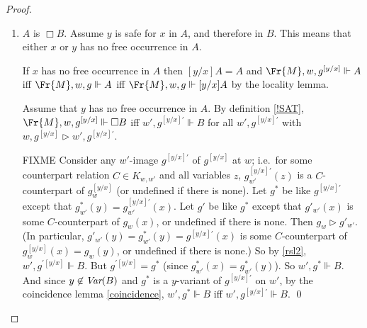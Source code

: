 \documentclass[11pt]{woarticle}
\theoremstyle{break}
\theoremstyle{nonumberplain}
\newcommand{\SAT}{\Vdash}
\newcommand{\Img}{\triangleright}
\newcommand{\1}{\;\,|\;\,}
\newcommand{\var}{\emph{Var}}
\newcommand{\fvar}{\emph{Varf}}
\renewcommand{\t}[1]{\ensuremath{\langle #1  \makebox[.2ex]{}\rangle}}
\begin{document}
\begin{proof}
\begin{enumerate}

    \item $A$ is $\Box B$.\; Assume $y$ is safe for $x$ in $A$, and therefore in
          $B$. This means that either $x$ or $y$ has no free occurrence in $A$.

          If $x$ has no free occurrence in $A$ then $[y/x]A = A$ and
          $\Fr{M},w,g^{[y/x]} \SAT A$ iff $\Fr{M},w,g \SAT A$ iff
          $\Fr{M},w,g \SAT [y/x]A$ by the locality lemma.

          Assume that $y$ has no free occurrence in $A$. By definition
          \ref{!SAT}, $\Fr{M},w,g^{[y/x]} \SAT \Box B$ iff
          $w',g^{[y/x]\prime} \SAT B$ for all $w',g^{[y/x]\prime}$ with
          $w,g^{[y/x]} \Img w',g^{[y/x]\prime}$.

          FIXME Consider any $w'$-image $g^{[y/x]\prime}$ of $g^{[y/x]}$ at
          $w$; i.e.\ for some counterpart relation $C\in K_{w,w'}$ and all
          variables $z$, $g^{[y/x]\prime}_{w'}(z)$ is a $C$-counterpart of
          $g^{[y/x]}_w$ (or undefined if there is none). Let $g^*$ be like
          $g^{[y/x]\prime}$ except that $g^*_{w'}(y) = g^{[y/x]\prime}_{w'}(x)$.
          Let $g'$ be like $g^*$ except that $g'_{w'}(x)$ is some
          $C$-counterpart of $g_w(x)$, or undefined if there is none. Then
          $g_w \Img g'_{w'}$. (In particular,
          $g'_{w'}(y) = g^*_{w'}(y) = g^{[y/x]\prime}(x)$ is some
          $C$-counterpart of $g^{[y/x]}_w(x) = g_w(y)$, or undefined if there is
          none.) So by \eqref{rsl2}, $w', g^{\prime[y/x]} \SAT B$. But
          $g^{\prime[y/x]} = g^*$ (since $g^*_{w'}(x) = g^*_{w'}(y)$). So
          $w',g^* \SAT B$. And since $y \not\in \var(B)$ and $g^*$ is a
          $y$-variant of $g^{[y/x]\prime}$ on $w'$, by the coincidence lemma
          \ref{coincidence}, $w',g^* \SAT B$ iff $w',g^{[y/x]\prime} \SAT B$.
          \qed


\end{enumerate}
\end{proof}
\end{document}
